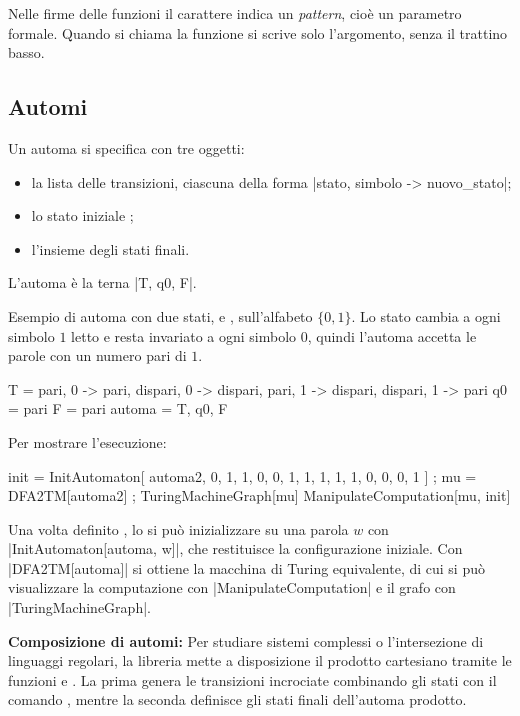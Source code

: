 \begin{rema}
Nelle firme delle funzioni il carattere \wolfram{_} indica un \emph{pattern}, cioè un parametro formale. Quando si chiama la funzione si scrive solo l'argomento, senza il trattino basso.
\end{rema}
\subsection{Automi}
\begin{defi}
Un automa si specifica con tre oggetti:
\begin{itemize}
\item la lista  delle transizioni, ciascuna della forma \wolfram|{stato, simbolo} -> nuovo_stato|;
\item lo stato iniziale ;
\item l'insieme  degli stati finali.
\end{itemize}
L'automa è la terna \wolfram|{T, q0, F}|.
\end{defi}
\begin{rema}
Esempio di automa con due stati,  e , sull'alfabeto $\{0,1\}$. Lo stato cambia a ogni simbolo $1$ letto e resta invariato a ogni simbolo $0$, quindi l'automa accetta le parole con un numero pari di $1$.
\begin{walfram}
T = {
  {pari, 0} -> pari,
  {dispari, 0} -> dispari,
  {pari, 1} -> dispari,
  {dispari, 1} -> pari
  }
q0 = pari
F = {pari}
automa = {T, q0, F}
\end{walfram}
Per mostrare l'esecuzione:
\begin{walfram}
init = InitAutomaton[
    automa2, {0, 1, 1, 0, 0, 1, 1, 1, 1, 1, 0, 0, 0, 1}
    ] ;
mu = DFA2TM[automa2] ;
TuringMachineGraph[mu]
ManipulateComputation[mu, init]
\end{walfram}
\end{rema}
\begin{rema}
Una volta definito , lo si può inizializzare su una parola $w$ con \wolfram|InitAutomaton[automa, w]|, che restituisce la configurazione iniziale. Con \wolfram|DFA2TM[automa]| si ottiene la macchina di Turing equivalente, di cui si può visualizzare la computazione con \wolfram|ManipulateComputation| e il grafo con \wolfram|TuringMachineGraph|.
\end{rema}
\begin{rema}
\textbf{Composizione di automi:}
Per studiare sistemi complessi o l'intersezione di linguaggi regolari, la libreria mette a disposizione il prodotto cartesiano tramite le funzioni  e . 
La prima genera le transizioni incrociate combinando gli stati con il comando , mentre la seconda definisce gli stati finali dell'automa prodotto.
\end{rema}

